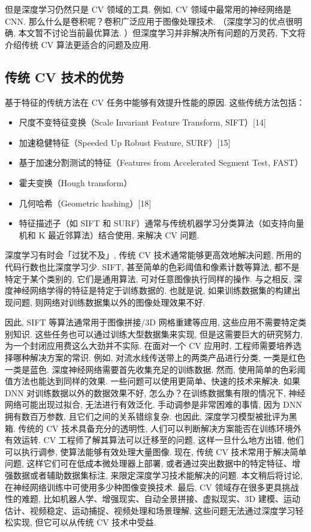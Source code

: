 但是深度学习仍然只是 CV 领域的工具. 例如, CV 领域中最常用的神经网络是 CNN. 那么什么是卷积呢？卷积广泛应用于图像处理技术. （深度学习的优点很明确, 本文暂不讨论当前最优算法. ）但深度学习并非解决所有问题的万灵药, 下文将介绍传统 CV 算法更适合的问题及应用.
\subsection{传统 CV 技术的优势}

基于特征的传统方法在 CV 任务中能够有效提升性能的原因. 这些传统方法包括：
\begin{itemize}
\item 尺度不变特征变换（Scale Invariant Feature Transform, SIFT）[14]
\item 加速稳健特征（Speeded Up Robust Feature, SURF）[15]
\item 基于加速分割测试的特征（Features from Accelerated Segment Test, FAST）\cite{Rosten2006}
\item 霍夫变换（Hough transform）\cite{Goldenshluger2004}
\item 几何哈希（Geometric hashing）[18]
\item 特征描述子（如 SIFT 和 SURF）通常与传统机器学习分类算法（如支持向量机和 K 最近邻算法）结合使用, 来解决 CV 问题.
\end{itemize}

深度学习有时会「过犹不及」, 传统 CV 技术通常能够更高效地解决问题, 所用的代码行数也比深度学习少. SIFT, 甚至简单的色彩阈值和像素计数等算法, 都不是特定于某个类别的, 它们是通用算法, 可对任意图像执行同样的操作. 与之相反, 深度神经网络学得的特征是特定于训练数据的. 也就是说, 如果训练数据集的构建出现问题, 则网络对训练数据集以外的图像处理效果不好.

因此, SIFT 等算法通常用于图像拼接/3D 网格重建等应用, 这些应用不需要特定类别知识. 这些任务也可以通过训练大型数据集来实现, 但是这需要巨大的研究努力, 为一个封闭应用费这么大劲并不实际. 在面对一个 CV 应用时, 工程师需要培养选择哪种解决方案的常识. 例如, 对流水线传送带上的两类产品进行分类, 一类是红色一类是蓝色. 深度神经网络需要首先收集充足的训练数据. 然而, 使用简单的色彩阈值方法也能达到同样的效果. 一些问题可以使用更简单、快速的技术来解决.
如果 DNN 对训练数据以外的数据效果不好, 怎么办？在训练数据集有限的情况下, 神经网络可能出现过拟合, 无法进行有效泛化. 手动调参是非常困难的事情, 因为 DNN 拥有数百万参数, 且它们之间的关系错综复杂. 也因此, 深度学习模型被批评为黑箱. 传统的 CV 技术具备充分的透明性, 人们可以判断解决方案能否在训练环境外有效运转. CV 工程师了解其算法可以迁移至的问题, 这样一旦什么地方出错, 他们可以执行调参, 使算法能够有效处理大量图像.
现在, 传统 CV 技术常用于解决简单问题, 这样它们可在低成本微处理器上部署, 或者通过突出数据中的特定特征、增强数据或者辅助数据集标注, 来限定深度学习技术能解决的问题. 本文稍后将讨论, 在神经网络训练中可使用多少种图像变换技术. 最后, CV 领域存在很多更具挑战性的难题, 比如机器人学、增强现实、自动全景拼接、虚拟现实、3D 建模、运动估计、视频稳定、运动捕捉、视频处理和场景理解, 这些问题无法通过深度学习轻松实现, 但它可以从传统 CV 技术中受益.

